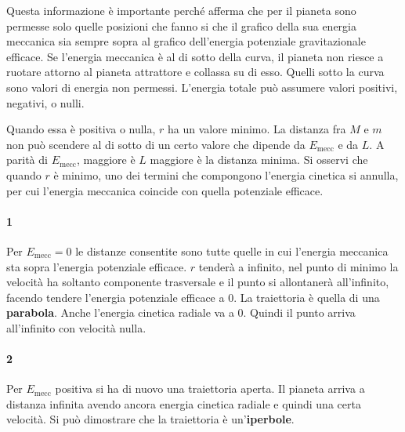 \documentclass[10pt,a4paper]{book}
\begin{document}
Questa informazione è importante perché afferma che per il pianeta sono permesse solo quelle posizioni che fanno si che il grafico della sua energia meccanica sia sempre sopra al grafico dell'energia potenziale gravitazionale efficace. Se l'energia meccanica è al di sotto della curva, il pianeta non riesce a ruotare attorno al pianeta attrattore e collassa su di esso. Quelli sotto la curva sono valori di energia non permessi. L'energia totale può assumere valori positivi, negativi, o nulli.

Quando essa è positiva o nulla, $r$ ha un valore minimo. La distanza fra $M$ e $m$ non può scendere al di sotto di un certo valore che dipende da $E_\text{mecc}$ e da $L$. A parità di $E_\text{mecc}$, maggiore è $L$ maggiore è la distanza minima. Si osservi che quando $r$ è minimo, uno dei termini che compongono l'energia cinetica si annulla, per cui l'energia meccanica coincide con quella potenziale efficace.

\paragraph{1} Per $E_\text{mecc}=0$ le distanze consentite sono tutte quelle in cui l'energia meccanica sta sopra l'energia potenziale efficace. $r$ tenderà a infinito, nel punto di minimo la velocità ha soltanto componente trasversale e il punto si allontanerà all'infinito, facendo tendere l'energia potenziale efficace a $0$. La traiettoria è quella di una \textbf{parabola}. Anche l'energia cinetica radiale va a $0$. Quindi il punto arriva all'infinito con velocità nulla.

\paragraph{2} Per $E_\text{mecc}$ positiva si ha di nuovo una traiettoria aperta. Il pianeta arriva a distanza infinita avendo ancora energia cinetica radiale e quindi una certa velocità. Si può dimostrare che la traiettoria è un'\textbf{iperbole}.
\end{document}
